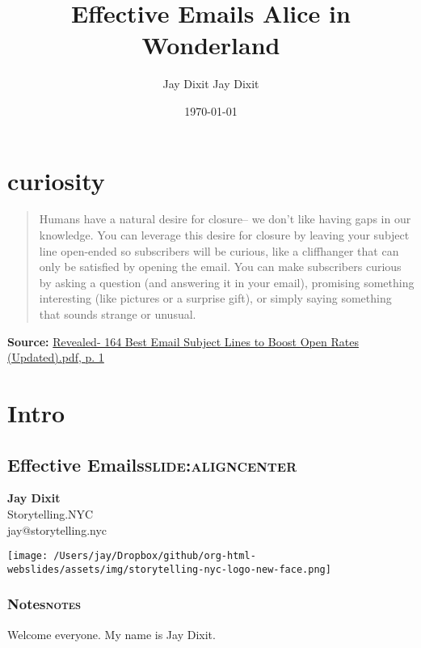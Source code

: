 \documentclass[12pt]{article}
\author{Jay Dixit Jay Dixit}
\date{\today}
\title{Effective Emails Alice in Wonderland}
\def\maketitle{ \newgeometry{margin=1in} \thispagestyle{empty} \vfill \null \cleardoublepage\restoregeometry}
\begin{document}
\maketitle
\tableofcontents
\newpage





\section{curiosity}
\label{sec:org30d1650}
\begin{quote}
Humans have a natural desire for closure– we don’t like having gaps in our knowledge. You can leverage this desire for closure by leaving your subject line open-ended so subscribers will be curious, like a cliffhanger that can only be satisfied by opening the email. You can make subscribers curious by asking a question (and answering it in your email), promising something interesting (like pictures or a surprise gift), or simply saying something that sounds strange or unusual.
\end{quote}
\textbf{Source:} \href{///Users/jay/devonthink-databases/NLI.dtBase2/Files.noindex/pdf/b/Revealed-\%20164\%20Best\%20Email\%20Subject\%20Lines\%20to\%20Boost\%20Open\%20Rates\%20(Updated).pdf::1}{Revealed- 164 Best Email Subject Lines to Boost Open Rates (Updated).pdf, p. 1}




\section{Intro}
\label{sec:orgccb5a32}


\subsection[Effective Emails]{Effective Emails\hfill{}\textsc{slide:aligncenter}}
\label{sec:org5ff203c}

\textbf{Jay Dixit} \\
Storytelling.NYC \\
jay@storytelling.nyc \\

\begin{center}
\texttt{[image: /Users/jay/Dropbox/github/org-html-webslides/assets/img/storytelling-nyc-logo-new-face.png]}
\end{center}

\subsubsection[Notes]{Notes\hfill{}\textsc{notes}}
\label{sec:orgdaf34bc}
Welcome everyone. My name is Jay Dixit.
\end{document}

